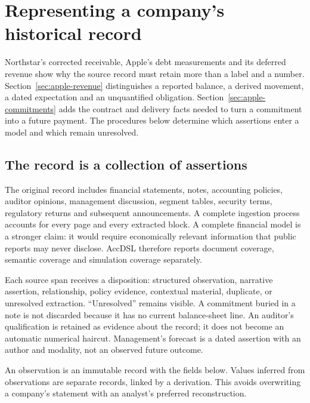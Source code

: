 \chapter{Representing a company's historical record}
\label{ch:history}

Northstar's corrected receivable, Apple's debt measurements and its deferred
revenue show why the source record must retain more than a label and a number.
Section~\ref{sec:apple-revenue} distinguishes a reported balance, a derived
movement, a dated expectation and an unquantified obligation.
Section~\ref{sec:apple-commitments} adds the contract and delivery facts needed
to turn a commitment into a future payment. The procedures below determine
which assertions enter a model and which remain unresolved.

\section{The record is a collection of assertions}

The original record includes financial statements, notes, accounting policies,
auditor opinions, management discussion, segment tables, security terms,
regulatory returns and subsequent announcements. A complete ingestion process
accounts for every page and every extracted block. A complete financial model
is a stronger claim: it would require economically relevant information that
public reports may never disclose. AccDSL therefore reports document coverage,
semantic coverage and simulation coverage separately.

Each source span receives a disposition: structured observation, narrative
assertion, relationship, policy evidence, contextual material, duplicate, or
unresolved extraction. ``Unresolved'' remains visible. A commitment buried in a
note is not discarded because it has no current balance-sheet line. An auditor's
qualification is retained as evidence about the record; it does not become an
automatic numerical haircut. Management's forecast is a dated assertion with
an author and modality, not an observed future outcome.

An observation is an immutable record with the fields below. Values inferred
from observations are separate records, linked by a derivation. This avoids
overwriting a company's statement with an analyst's preferred reconstruction.

